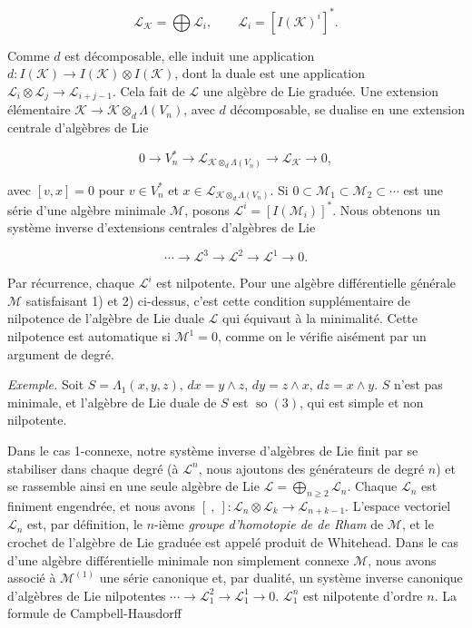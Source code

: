 \documentclass[
  french,
  a3paper,
  a3paper]{extarticle}
\begin{document}
\[
\mathcal L_{\mathcal K}=\bigoplus\mathcal L_i,\qquad \mathcal L_i=[I(\mathcal K)^i]^*.
\]

Comme \(d\) est décomposable, elle induit une application
\(d:I(\mathcal K)\to I(\mathcal K)\otimes I(\mathcal K)\), dont la duale
est une application
\(\mathcal L_i\otimes\mathcal L_j\to\mathcal L_{i+j-1}\). Cela fait de
\(\mathcal L\) une algèbre de Lie graduée. Une extension élémentaire
\(\mathcal K\to\mathcal K\otimes_d\Lambda(V_n)\), avec \(d\)
décomposable, se dualise en une extension centrale d'algèbres de Lie

\[
0\to V_n^*\to\mathcal L_{\mathcal K\otimes_d\Lambda(V_n)}\to\mathcal L_{\mathcal K}\to0,
\]

avec \([v,x]=0\) pour \(v\in V_n^*\) et
\(x\in\mathcal L_{\mathcal K\otimes_d\Lambda(V_n)}\). Si
\(0\subset\mathcal M_1\subset\mathcal M_2\subset\cdots\) est une série
d'une algèbre minimale \(\mathcal M\), posons
\(\mathcal L^i=[I(\mathcal M_i)]^*\). Nous obtenons un système inverse
d'extensions centrales d'algèbres de Lie

\[
\cdots\to\mathcal L^3\to\mathcal L^2\to\mathcal L^1\to0.
\]

Par récurrence, chaque \(\mathcal L^i\) est nilpotente. Pour une algèbre
différentielle générale \(\mathcal M\) satisfaisant 1) et 2) ci-dessus,
c'est cette condition supplémentaire de nilpotence de l'algèbre de Lie
duale \(\mathcal L\) qui équivaut à la minimalité. Cette nilpotence est
automatique si \(\mathcal M^1=0\), comme on le vérifie aisément par un
argument de degré.

\emph{Exemple.} Soit \(S=\Lambda_1(x,y,z)\), \(dx=y\wedge z\),
\(dy=z\wedge x\), \(dz=x\wedge y\). \(S\) n'est pas minimale, et
l'algèbre de Lie duale de \(S\) est \(\operatorname{so}(3)\), qui est
simple et non nilpotente.

Dans le cas 1-connexe, notre système inverse d'algèbres de Lie finit par
se stabiliser dans chaque degré (à \(\mathcal L^n\), nous ajoutons des
générateurs de degré \(n\)) et se rassemble ainsi en une seule algèbre
de Lie \(\mathcal L=\bigoplus_{n\ge2}\mathcal L_n\). Chaque
\(\mathcal L_n\) est finiment engendrée, et nous avons
\([\ ,\ ]:\mathcal L_n\otimes\mathcal L_k\to\mathcal L_{n+k-1}\).
L'espace vectoriel \(\mathcal L_n\) est, par définition, le \(n\)-ième
\emph{groupe d'homotopie de de Rham} de \(\mathcal M\), et le crochet de
l'algèbre de Lie graduée est appelé produit de Whitehead. Dans le cas
d'une algèbre différentielle minimale non simplement connexe
\(\mathcal M\), nous avons associé à \(\mathcal M^{(1)}\) une série
canonique et, par dualité, un système inverse canonique d'algèbres de
Lie nilpotentes \(\cdots\to\mathcal L_1^2\to\mathcal L_1^1\to0\).
\(\mathcal L_1^n\) est nilpotente d'ordre \(n\). La formule de
Campbell-Hausdorff
\end{document}
